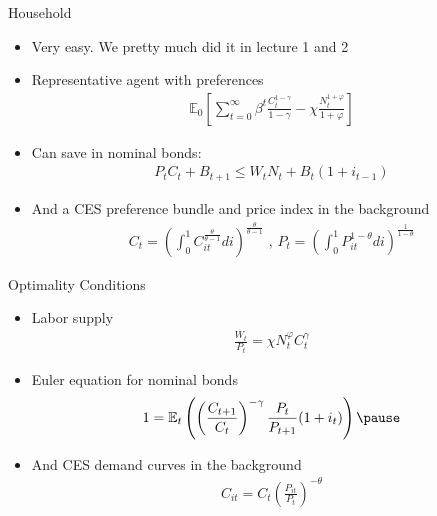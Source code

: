 \documentclass[11pt,aspectratio=169,xcolor={dvipsnames},hyperref={pdftex,pdfpagemode=UseNone,hidelinks,pdfdisplaydoctitle=true},usepdftitle=false]{beamer}
\begin{document}
\begin{frame}{Household}
\begin{itemize}
\item Very easy. We pretty much did it in lecture 1 and 2
\item Representative agent with preferences
\begin{align*}
\mathbb{E}_0 \left[ \sum_{t=0}^{\infty} \beta^t \frac{C^{1-\gamma}_t}{1-\gamma} - \chi \frac{N^{1+\varphi}_t}{1+\varphi} \right]
\end{align*}
\pause
\item Can save in nominal bonds:
\begin{align*}
P_t C_t + B_{t+1}  \leq W_t N_t + B_t (1+i_{t-1}) 
\end{align*}
\pause
\item And a CES preference bundle and price index in the background
\begin{align*}
C_t = \left(\int_0^1 C^{\frac{\theta}{\theta-1}}_{it} di \right)^{\frac{\theta}{\theta-1}} \text{     ,    } P_t = \left(\int_0^1 P^{1-\theta}_{it} di \right)^{\frac{1}{1-\theta}} 
\end{align*}
\end{itemize}
\end{frame}

\begin{frame}{Optimality Conditions}
\begin{itemize}
\item Labor supply
\begin{align*}
\frac{W_t}{P_t} = \chi N^{\varphi}_t C_t^{\gamma}
\end{align*}
\pause
\item Euler equation for nominal bonds
\begin{align*}
1 = \mathbb{E}_t \left( \left(\frac{C_{t+1}}{C_t}\right)^{-\gamma} \frac{P_t}{P_{t+1}}(1+i_t)\right)
\pause
\end{align*}
\item And CES demand curves in the background
\begin{align*}
C_{it} = C_t \left(\frac{P_{it}}{P_t}\right)^{-\theta}
\end{align*}
\end{itemize}
\end{frame}
\end{document}
